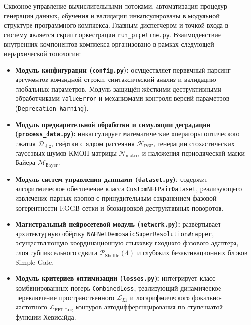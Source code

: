 \documentclass[12pt,a4paper]{article}
\begin{document}
Сквозное управление вычислительными потоками, автоматизация процедур генерации данных, обучения и валидации инкапсулированы в модульной структуре программного комплекса. Главным диспетчером и точкой входа в систему является скрипт оркестрации \texttt{run\_pipeline.py}. Взаимодействие внутренних компонентов комплекса организовано в рамках следующей иерархической топологии:
\begin{itemize}
    \item \textbf{Модуль конфигурации (\texttt{config.py}):} осуществляет первичный парсинг аргументов командной строки, синтаксический анализ и валидацию глобальных параметров. Модуль защищён жёсткими деструктивными обработчиками \texttt{ValueError} и механизмами контроля версий параметров (\texttt{Deprecation Warning}).
    \item \textbf{Модуль предварительной обработки и симуляции деградации (\texttt{process\_data.py}):} инкапсулирует математические операторы оптического сжатия $\mathcal{D}_{\downarrow 2}$, свёртки с ядром рассеяния $\mathcal{H}_{\operatorname{PSF}}$, генерации стохастических гауссовых шумов КМОП-матрицы $\mathcal{N}_{\operatorname{matrix}}$ и наложения периодической маски Байера $\mathcal{M}_{\operatorname{Bayer}}$.
    \item \textbf{Модуль систем управления данными (\texttt{dataset.py}):} содержит алгоритмическое обеспечение класса \texttt{CustomNEFPairDataset}, реализующего извлечение парных кропов с принудительным сохранением фазовой когерентности $\text{RGGB}$-сетки и блокировкой деструктивных поворотов.
    \item \textbf{Магистральный нейросетевой модуль (\texttt{network.py}):} развёртывает архитектурную обёртку \texttt{NAFNetDemosaicSuperResolutionWrapper}, осуществляющую координационную стыковку входного фазового адаптера, слоя субпиксельного сдвига $\mathcal{P}_{\operatorname{Shuffle}}(4)$ и глубоких безактивационных блоков Simple Gate.
    \item \textbf{Модуль критериев оптимизации (\texttt{losses.py}):} интегрирует класс комбинированных потерь \texttt{CombinedLoss}, реализующий динамическое переключение пространственного $\mathcal{L}_{L1}$ и логарифмического фокально-частотного $\mathcal{L}_{\operatorname{FFL-Log}}$ контуров автодифференцирования по ступенчатой функции Хевисайда.
\end{itemize}

\end{document}

